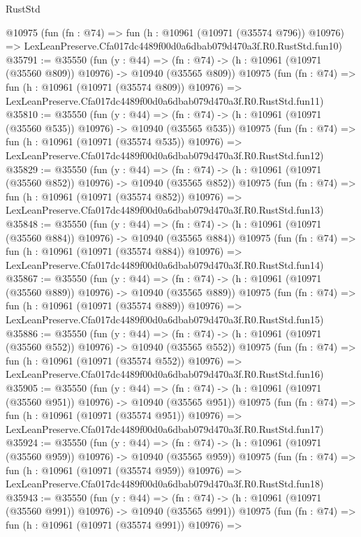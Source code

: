 \begin{lexlean}{RustStd}
\begin{coremodule}
    @10975
    (fun (fn : @74) =>
    fun (h : @10961 (@10971 (@35574 @796)) @10976) =>
    LexLeanPreserve.Cfa017dc4489f00d0a6dbab079d470a3f.R0.RustStd.fun10)
@35791 := @35550
    (fun (y : @44) =>
    (fn : @74) -> (h : @10961 (@10971 (@35560 @809)) @10976) -> @10940 (@35565 @809))
    @10975
    (fun (fn : @74) =>
    fun (h : @10961 (@10971 (@35574 @809)) @10976) =>
    LexLeanPreserve.Cfa017dc4489f00d0a6dbab079d470a3f.R0.RustStd.fun11)
@35810 := @35550
    (fun (y : @44) =>
    (fn : @74) -> (h : @10961 (@10971 (@35560 @535)) @10976) -> @10940 (@35565 @535))
    @10975
    (fun (fn : @74) =>
    fun (h : @10961 (@10971 (@35574 @535)) @10976) =>
    LexLeanPreserve.Cfa017dc4489f00d0a6dbab079d470a3f.R0.RustStd.fun12)
@35829 := @35550
    (fun (y : @44) =>
    (fn : @74) -> (h : @10961 (@10971 (@35560 @852)) @10976) -> @10940 (@35565 @852))
    @10975
    (fun (fn : @74) =>
    fun (h : @10961 (@10971 (@35574 @852)) @10976) =>
    LexLeanPreserve.Cfa017dc4489f00d0a6dbab079d470a3f.R0.RustStd.fun13)
@35848 := @35550
    (fun (y : @44) =>
    (fn : @74) -> (h : @10961 (@10971 (@35560 @884)) @10976) -> @10940 (@35565 @884))
    @10975
    (fun (fn : @74) =>
    fun (h : @10961 (@10971 (@35574 @884)) @10976) =>
    LexLeanPreserve.Cfa017dc4489f00d0a6dbab079d470a3f.R0.RustStd.fun14)
@35867 := @35550
    (fun (y : @44) =>
    (fn : @74) -> (h : @10961 (@10971 (@35560 @889)) @10976) -> @10940 (@35565 @889))
    @10975
    (fun (fn : @74) =>
    fun (h : @10961 (@10971 (@35574 @889)) @10976) =>
    LexLeanPreserve.Cfa017dc4489f00d0a6dbab079d470a3f.R0.RustStd.fun15)
@35886 := @35550
    (fun (y : @44) =>
    (fn : @74) -> (h : @10961 (@10971 (@35560 @552)) @10976) -> @10940 (@35565 @552))
    @10975
    (fun (fn : @74) =>
    fun (h : @10961 (@10971 (@35574 @552)) @10976) =>
    LexLeanPreserve.Cfa017dc4489f00d0a6dbab079d470a3f.R0.RustStd.fun16)
@35905 := @35550
    (fun (y : @44) =>
    (fn : @74) -> (h : @10961 (@10971 (@35560 @951)) @10976) -> @10940 (@35565 @951))
    @10975
    (fun (fn : @74) =>
    fun (h : @10961 (@10971 (@35574 @951)) @10976) =>
    LexLeanPreserve.Cfa017dc4489f00d0a6dbab079d470a3f.R0.RustStd.fun17)
@35924 := @35550
    (fun (y : @44) =>
    (fn : @74) -> (h : @10961 (@10971 (@35560 @959)) @10976) -> @10940 (@35565 @959))
    @10975
    (fun (fn : @74) =>
    fun (h : @10961 (@10971 (@35574 @959)) @10976) =>
    LexLeanPreserve.Cfa017dc4489f00d0a6dbab079d470a3f.R0.RustStd.fun18)
@35943 := @35550
    (fun (y : @44) =>
    (fn : @74) -> (h : @10961 (@10971 (@35560 @991)) @10976) -> @10940 (@35565 @991))
    @10975
    (fun (fn : @74) =>
    fun (h : @10961 (@10971 (@35574 @991)) @10976) =>

\end{coremodule}
\end{lexlean}

